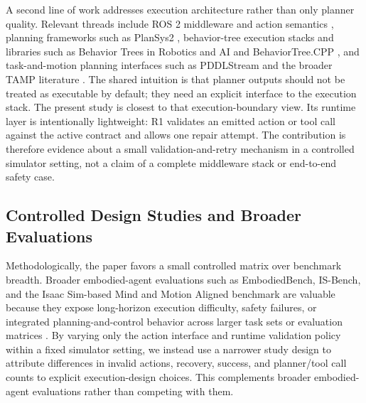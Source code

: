 A second line of work addresses execution architecture rather than only planner
quality. Relevant threads include ROS 2 middleware and action semantics
\cite{macenski2022ros2,biggs2019ros2actions}, planning frameworks such as
PlanSys2 \cite{martin2021plansys2}, behavior-tree execution stacks and
libraries such as Behavior Trees in Robotics and AI and BehaviorTree.CPP
\cite{colledanchise2018behaviortrees,behaviortreecppdocs}, and task-and-motion
planning interfaces such as PDDLStream and the broader TAMP literature
\cite{garrett2020pddlstream,garrett2021integratedtamp}. The shared intuition is
that planner outputs should not be treated as executable by default; they need
an explicit interface to the execution stack. The present study is closest to
that execution-boundary view. Its runtime layer is intentionally lightweight:
R1 validates an emitted action or tool call against the active contract and
allows one repair attempt. The contribution is therefore evidence about a small
validation-and-retry mechanism in a controlled simulator setting, not a claim
of a complete middleware stack or end-to-end safety case.

\subsection{Controlled Design Studies and Broader Evaluations}

Methodologically, the paper favors a small controlled matrix over benchmark
breadth. Broader embodied-agent evaluations such as EmbodiedBench, IS-Bench,
and the Isaac Sim-based Mind and Motion Aligned benchmark are valuable because
they expose long-horizon execution difficulty, safety failures, or integrated
planning-and-control behavior across larger task sets or evaluation matrices
\cite{yang2025embodiedbench,lu2025isbench,kachaev2025mindmotionaligned}. By
varying only the action interface and runtime validation policy within a fixed
simulator setting, we instead use a narrower study design to attribute
differences in invalid actions, recovery, success, and planner/tool call counts to
explicit execution-design choices. This complements broader embodied-agent
evaluations rather than competing with them.
